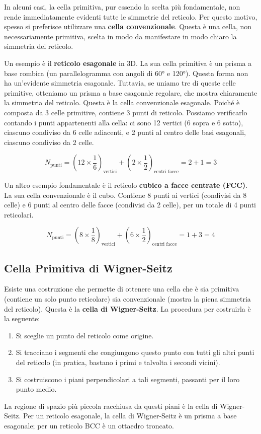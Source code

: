 In alcuni casi, la cella primitiva, pur essendo la scelta più fondamentale, non rende immediatamente evidenti tutte le simmetrie del reticolo. Per questo motivo, spesso si preferisce utilizzare una \textbf{cella convenzionale}. Questa è una cella, non necessariamente primitiva, scelta in modo da manifestare in modo chiaro la simmetria del reticolo.

Un esempio è il \textbf{reticolo esagonale} in 3D. La sua cella primitiva è un prisma a base rombica (un parallelogramma con angoli di 60° e 120°). Questa forma non ha un'evidente simmetria esagonale. Tuttavia, se uniamo tre di queste celle primitive, otteniamo un prisma a base esagonale regolare, che mostra chiaramente la simmetria del reticolo. Questa è la cella convenzionale esagonale. Poiché è composta da 3 celle primitive, contiene 3 punti di reticolo. Possiamo verificarlo contando i punti appartenenti alla cella: ci sono 12 vertici (6 sopra e 6 sotto), ciascuno condiviso da 6 celle adiacenti, e 2 punti al centro delle basi esagonali, ciascuno condiviso da 2 celle.

\begin{equation}
    N_{\text{punti}} = \left(12 \times \frac{1}{6}\right)_{\text{vertici}} + \left(2 \times \frac{1}{2}\right)_{\text{centri facce}} = 2 + 1 = 3
\end{equation}

Un altro esempio fondamentale è il reticolo \textbf{cubico a facce centrate (FCC)}. La sua cella convenzionale è il cubo. Contiene 8 punti ai vertici (condivisi da 8 celle) e 6 punti al centro delle facce (condivisi da 2 celle), per un totale di 4 punti reticolari.

\begin{equation}
    N_{\text{punti}} = \left(8 \times \frac{1}{8}\right)_{\text{vertici}} + \left(6 \times \frac{1}{2}\right)_{\text{centri facce}} = 1 + 3 = 4
\end{equation}

\subsection{Cella Primitiva di Wigner-Seitz}

Esiste una costruzione che permette di ottenere una cella che è sia primitiva (contiene un solo punto reticolare) sia convenzionale (mostra la piena simmetria del reticolo). Questa è la \textbf{cella di Wigner-Seitz}. La procedura per costruirla è la seguente:
\begin{enumerate}
    \item Si sceglie un punto del reticolo come origine.
    \item Si tracciano i segmenti che congiungono questo punto con tutti gli altri punti del reticolo (in pratica, bastano i primi e talvolta i secondi vicini).
    \item Si costruiscono i piani perpendicolari a tali segmenti, passanti per il loro punto medio.
\end{enumerate}
La regione di spazio più piccola racchiusa da questi piani è la cella di Wigner-Seitz. Per un reticolo esagonale, la cella di Wigner-Seitz è un prisma a base esagonale; per un reticolo BCC è un ottaedro troncato.


